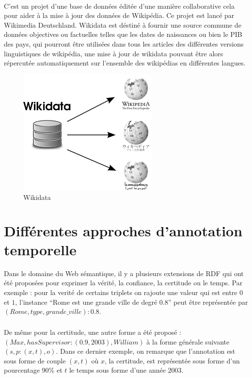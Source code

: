 \paragraph{}
C'est un projet d'une base de données éditée d'une manière collaborative cela pour aider à la mise à jour des données de Wikipédia. Ce projet est lancé par Wikimedia Deutschland. Wikidata est déstiné à fournir une source commune de données objectives ou factuelles telles que les dates de naissances ou bien le PIB des pays, qui pourront être utilisées dans tous les articles des différentes versions linguistiques de wikipédia, une mise à jour de wikidata  pouvant être alors répercutée automatiquement sur l'ensemble des wikipédias en différentes langues.   
\begin{figure}[H]
\centering
\includegraphics[width=7cm]{wikidatawikipedia.png}
\caption{Wikidata}
\end{figure}
\newpage
\section{Différentes approches d'annotation temporelle}			
\paragraph{}
Dans le domaine du Web sémantique, il y a plusieurs extensions de RDF qui ont été proposées pour exprimer la vérité, la confiance, la certitude ou le temps.
Par exemple : pour la verité de certains triplets on rajoute une valeur qui est entre $0$ et $1$, l’instance “Rome est une grande ville de degré 0.8” peut être représentée par $(Rome, type,grande{\_}ville) : 0.8$.
\subparagraph{}
De même pour la certitude, une autre forme a été proposé :
\newline
$(Max,hasSupervisor : (0.9,2003),William)$ à la forme générale suivante $(s, p : (x,t),o)$.
\newline
Dans ce dernier exemple, on remarque que l'annotation est sous forme de couple $(x, t)$ où $x$, la certitude, est représentée sous forme d'un pourcentage 90\% et $t$ le temps sous forme d'une année $2003$.
